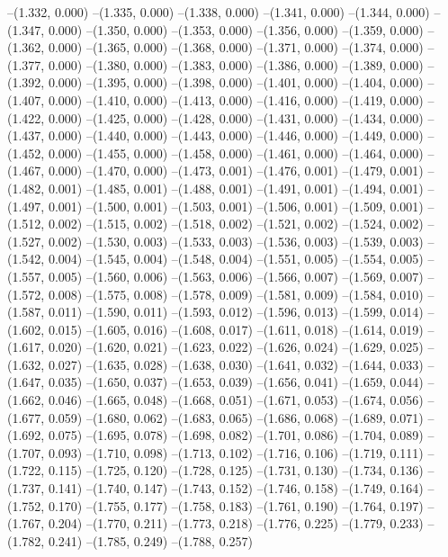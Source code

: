 --(1.332, 0.000)
--(1.335, 0.000)
--(1.338, 0.000)
--(1.341, 0.000)
--(1.344, 0.000)
--(1.347, 0.000)
--(1.350, 0.000)
--(1.353, 0.000)
--(1.356, 0.000)
--(1.359, 0.000)
--(1.362, 0.000)
--(1.365, 0.000)
--(1.368, 0.000)
--(1.371, 0.000)
--(1.374, 0.000)
--(1.377, 0.000)
--(1.380, 0.000)
--(1.383, 0.000)
--(1.386, 0.000)
--(1.389, 0.000)
--(1.392, 0.000)
--(1.395, 0.000)
--(1.398, 0.000)
--(1.401, 0.000)
--(1.404, 0.000)
--(1.407, 0.000)
--(1.410, 0.000)
--(1.413, 0.000)
--(1.416, 0.000)
--(1.419, 0.000)
--(1.422, 0.000)
--(1.425, 0.000)
--(1.428, 0.000)
--(1.431, 0.000)
--(1.434, 0.000)
--(1.437, 0.000)
--(1.440, 0.000)
--(1.443, 0.000)
--(1.446, 0.000)
--(1.449, 0.000)
--(1.452, 0.000)
--(1.455, 0.000)
--(1.458, 0.000)
--(1.461, 0.000)
--(1.464, 0.000)
--(1.467, 0.000)
--(1.470, 0.000)
--(1.473, 0.001)
--(1.476, 0.001)
--(1.479, 0.001)
--(1.482, 0.001)
--(1.485, 0.001)
--(1.488, 0.001)
--(1.491, 0.001)
--(1.494, 0.001)
--(1.497, 0.001)
--(1.500, 0.001)
--(1.503, 0.001)
--(1.506, 0.001)
--(1.509, 0.001)
--(1.512, 0.002)
--(1.515, 0.002)
--(1.518, 0.002)
--(1.521, 0.002)
--(1.524, 0.002)
--(1.527, 0.002)
--(1.530, 0.003)
--(1.533, 0.003)
--(1.536, 0.003)
--(1.539, 0.003)
--(1.542, 0.004)
--(1.545, 0.004)
--(1.548, 0.004)
--(1.551, 0.005)
--(1.554, 0.005)
--(1.557, 0.005)
--(1.560, 0.006)
--(1.563, 0.006)
--(1.566, 0.007)
--(1.569, 0.007)
--(1.572, 0.008)
--(1.575, 0.008)
--(1.578, 0.009)
--(1.581, 0.009)
--(1.584, 0.010)
--(1.587, 0.011)
--(1.590, 0.011)
--(1.593, 0.012)
--(1.596, 0.013)
--(1.599, 0.014)
--(1.602, 0.015)
--(1.605, 0.016)
--(1.608, 0.017)
--(1.611, 0.018)
--(1.614, 0.019)
--(1.617, 0.020)
--(1.620, 0.021)
--(1.623, 0.022)
--(1.626, 0.024)
--(1.629, 0.025)
--(1.632, 0.027)
--(1.635, 0.028)
--(1.638, 0.030)
--(1.641, 0.032)
--(1.644, 0.033)
--(1.647, 0.035)
--(1.650, 0.037)
--(1.653, 0.039)
--(1.656, 0.041)
--(1.659, 0.044)
--(1.662, 0.046)
--(1.665, 0.048)
--(1.668, 0.051)
--(1.671, 0.053)
--(1.674, 0.056)
--(1.677, 0.059)
--(1.680, 0.062)
--(1.683, 0.065)
--(1.686, 0.068)
--(1.689, 0.071)
--(1.692, 0.075)
--(1.695, 0.078)
--(1.698, 0.082)
--(1.701, 0.086)
--(1.704, 0.089)
--(1.707, 0.093)
--(1.710, 0.098)
--(1.713, 0.102)
--(1.716, 0.106)
--(1.719, 0.111)
--(1.722, 0.115)
--(1.725, 0.120)
--(1.728, 0.125)
--(1.731, 0.130)
--(1.734, 0.136)
--(1.737, 0.141)
--(1.740, 0.147)
--(1.743, 0.152)
--(1.746, 0.158)
--(1.749, 0.164)
--(1.752, 0.170)
--(1.755, 0.177)
--(1.758, 0.183)
--(1.761, 0.190)
--(1.764, 0.197)
--(1.767, 0.204)
--(1.770, 0.211)
--(1.773, 0.218)
--(1.776, 0.225)
--(1.779, 0.233)
--(1.782, 0.241)
--(1.785, 0.249)
--(1.788, 0.257)

